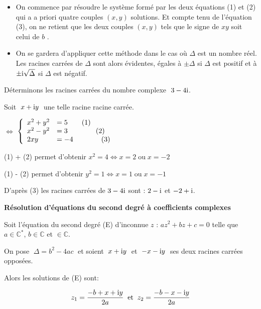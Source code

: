 \begin{remark}
\begin{itemize}
\item On commence par résoudre le système formé par les deux équations (1) et (2) qui a a priori quatre
couples $(x , y )$ solutions. Et compte tenu de l'équation (3), on ne retient que les deux couples $(x , y )$
tels que le signe de $xy$ soit celui de $ b $ .
\item On se gardera d'appliquer cette méthode dans le cas où $ \Delta $ est un nombre réel. Les racines carrées de
$ \Delta $ sont alors évidentes, égales à   $ \pm \Delta $ si $ \Delta $ est positif et à  $ \pm\text{i}\sqrt{\Delta} $ si  $ \Delta $ est négatif.
\end{itemize}
\end{remark}
\begin{example}
Déterminons les racines carrées du nombre complexe  $\; 3-4\text{i} $.

Soit $\; x+\text{i} y \;$ une telle racine racine carrée.

 \medskip
   
  \hspace*{2cm}  $ \Longleftrightarrow  $ 
 $\left\{\begin{array}{l l}
 x^2 +y^2&=5\qquad (1)\\
 x^2 -y^2 & =3 \qquad \qquad (2)\\ 	 
 2xy& = -4  \qquad \qquad (3)
\end{array}\right.$ 

\medskip
(1) + (2) permet d'obtenir $ x^2=4\Longleftrightarrow x=2 \; \text{ou}\; x=-2 $

\medskip
(1) - (2) permet d'obtenir $ y^2=1\Longleftrightarrow x=1 \; \text{ou}\; x=-1 $

\medskip

D'après (3)  les racines carrées de   $ 3-4\text{i} $ sont :\;\; $2-\text{i} $ et $-2+\text{i} $.
\end{example}

\textbf{Résolution d'équations du second degré à coefficients complexes}
\begin{property}
Soit l'équation  du second degré  (E) d'inconnue $ z $ :\; $ a z^2+b z+c=0 $\; telle que $ a\in\mathbb{C}^{\ast} $,\; $ b\in\mathbb{C} $ et $ \in\mathbb{C} $.

\medskip


On pose $ \;\Delta  =b^2- 4ac \;$ et soient $\; x+\text{i} y \;$ et $\; -x-\text{i} y \;$ ses deux racines carrées opposées.

\medskip

 Alors les solutions de (E) sont:
  
  $$  z_1=\dfrac{-b+ x+\text{i} y}{2a} \;\; \text{et} \;\; z_2=\dfrac{-b-x-\text{i} y}{2a} $$ 
\end{property}

